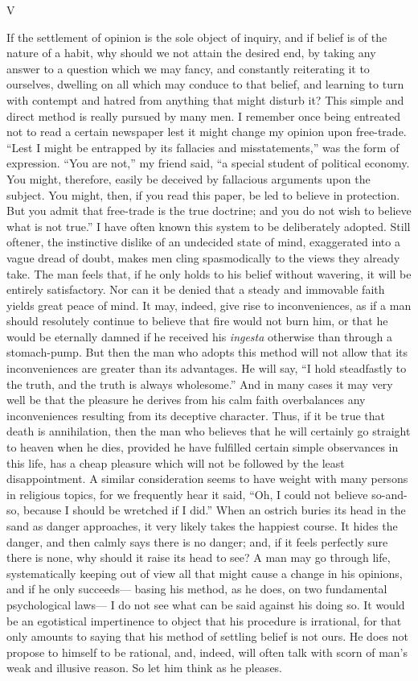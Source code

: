 \documentclass[]{article}
\newcommand*{\itemsection}[1]{\bigskip\centerline{#1}\nopagebreak}
\begin{document}
\itemsection{V}

If the settlement of opinion is the sole object of inquiry, and if belief is of the nature of a habit, why should we not attain the desired end, by taking any answer to a question which we may fancy, and constantly reiterating it to ourselves, dwelling on all which may conduce to that belief, and learning to turn with contempt and hatred from anything that might disturb it? This simple and direct method is really pursued by many men. I remember once being entreated not to read a certain newspaper lest it might change my opinion upon free-trade. ``Lest I might be entrapped by its fallacies and misstatements,'' was the form of expression. ``You are not,'' my friend said, ``a special student of political economy. You might, therefore, easily be deceived by fallacious arguments upon the subject. You might, then, if you read this paper, be led to believe in protection. But you admit that free-trade is the true doctrine; and you do not wish to believe what is not true.'' I have often known this system to be deliberately adopted. Still oftener, the instinctive dislike of an undecided state of mind, exaggerated into a vague dread of doubt, makes men cling spasmodically to the views they already take. The man feels that, if he only holds to his belief without wavering, it will be entirely satisfactory. Nor can it be denied that a steady and immovable faith yields great peace of mind. It may, indeed, give rise to inconveniences, as if a man should resolutely continue to believe that fire would not burn him, or that he would be eternally damned if he received his \emph{ingesta} otherwise than through a stomach-pump. But then the man who adopts this method will not allow that its inconveniences are greater than its advantages. He will say, ``I hold steadfastly to the truth, and the truth is always wholesome.'' And in many cases it may very well be that the pleasure he derives from his calm faith overbalances any inconveniences resulting from its deceptive character. Thus, if it be true that death is annihilation, then the man who believes that he will certainly go straight to heaven when he dies, provided he have fulfilled certain simple observances in this life, has a cheap pleasure which will not be followed by the least disappointment. A similar consideration seems to have weight with many persons in religious topics, for we frequently hear it said, ``Oh, I could not believe so-and-so, because I should be wretched if I did.'' When an ostrich buries its head in the sand as danger approaches, it very likely takes the happiest course. It hides the danger, and then calmly says there is no danger; and, if it feels perfectly sure there is none, why should it raise its head to see? A man may go through life, systematically keeping out of view all that might cause a change in his opinions, and if he only succeeds--- basing his method, as he does, on two fundamental psychological laws--- I do not see what can be said against his doing so. It would be an egotistical impertinence to object that his procedure is irrational, for that only amounts to saying that his method of settling belief is not ours. He does not propose to himself to be rational, and, indeed, will often talk with scorn of man's weak and illusive reason. So let him think as he pleases.
\end{document}
